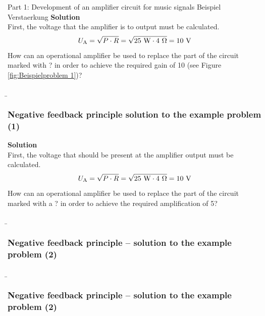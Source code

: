 \begin{frame}
{\begin{expl}{ Part 1: Development of an amplifier circuit for music signals}{ Beispiel Verstaerkung }
        \textbf{Solution}\\
        First, the voltage that the amplifier is to output must be calculated.
        \begin{equation}
            U_{\textnormal{A}} = \sqrt{P \cdot R} = \sqrt{25~\mathrm{W} \cdot 4~\mathrm{\Omega}} = 10~\textnormal{V}
        \end{equation}
        How can an operational amplifier be used to replace the part of the circuit marked with \glqq ?\grqq{} in order to achieve the required gain of 10 (see Figure \ref{fig:Beispielproblem 1})?
    \end{expl}}


    \b{
        \frametitle{Negative feedback principle solution to the example problem (1)}
        \textbf{Solution}\\
        First, the voltage that should be present at the amplifier output must be calculated.
        \begin{equation}
            U_{\textnormal{A}} = \sqrt{P \cdot R} = \sqrt{25~\mathrm{W} \cdot 4~\mathrm{\Omega}} = 10~\textnormal{V}
        \end{equation}
        How can an operational amplifier be used to replace the part of the circuit marked with a \glqq ?\grqq{} in order to achieve the required amplification of 5?
    }
\end{frame}

\begin{frame}
    \b{
            \frametitle{Negative feedback principle – solution to the example problem (2)}
        }
    \end{frame}
    \begin{frame}
        \b{
            \frametitle{Negative feedback principle – solution to the example problem (2)}
        }
    \end{frame}

